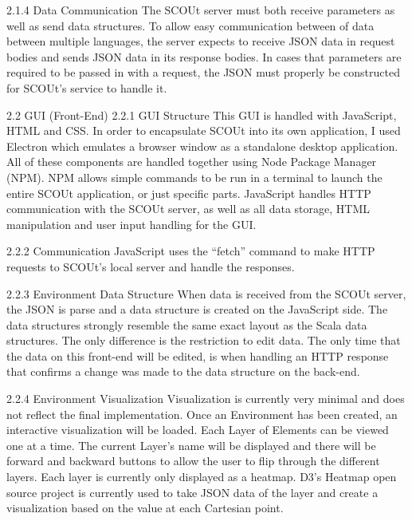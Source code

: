 \documentclass[]{report}
\begin{document}
2.1.4 Data Communication
The SCOUt server must both receive parameters as well as send data structures.
To allow easy communication between of data between multiple languages, the server expects to receive JSON data in request bodies and sends JSON data in its response bodies.
In cases that parameters are required to be passed in with a request, the JSON must properly be constructed for SCOUt’s service to handle it.

2.2 GUI (Front-End)
2.2.1 GUI Structure
This GUI is handled with JavaScript, HTML and CSS.
In order to encapsulate SCOUt into its own application, I used Electron which emulates a browser window as a standalone desktop application.
All of these components are handled together using Node Package Manager (NPM).
NPM allows simple commands to be run in a terminal to launch the entire SCOUt application, or just specific parts.
JavaScript handles HTTP communication with the SCOUt server, as well as all data storage, HTML manipulation and user input handling for the GUI.

2.2.2 Communication
JavaScript uses the “fetch” command to make HTTP requests to SCOUt’s local server and handle the responses.

2.2.3 Environment Data Structure
When data is received from the SCOUt server, the JSON is parse and a data structure is created on the JavaScript side.
The data structures strongly resemble the same exact layout as the Scala data structures.
The only difference is the restriction to edit data. The only time that the data on this front-end will be edited, is when handling an HTTP response that confirms a change was made to the data structure on the back-end.

2.2.4 Environment Visualization
Visualization is currently very minimal and does not reflect the final implementation.
Once an Environment has been created, an interactive visualization will be loaded.
Each Layer of Elements can be viewed one at a time.
The current Layer’s name will be displayed and there will be forward and backward buttons to allow the user to flip through the different layers.
Each layer is currently only displayed as a heatmap.
D3’s Heatmap open source project is currently used to take JSON data of the layer and create a visualization based on the value at each Cartesian point.
\end{document}
